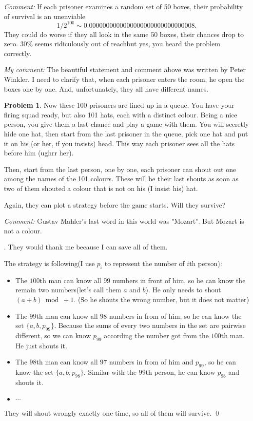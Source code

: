 \documentclass[12pt]{article}
\theoremstyle{definition}
\newtheorem{hw}{Problem}
\newenvironment{sol}
  {\par\vspace{3mm}\noindent{\it Solution}.}
  {\qed}
\begin{document}
{\em Comment:} If each prisoner examines a random set of 50 boxes, their probability of survival
is an unenviable 
\[1/2^{100} \sim 0.0000000000000000000000000000008.\] They could do worse if they all
look in the same 50 boxes, their chances drop to zero. 30\% seems ridiculously out of reachbut
yes, you heard the problem correctly.

{\em My comment:} The beautiful statement and comment above was written by Peter Winkler. I need
to clarify that, when each prisoner enters the room, he open
the boxes one by one. And, unfortunately, they all have different names.

\begin{hw}
Now these 100 prisoners are lined up in a queue. You have your firing squad ready, but also 101 hats, each with a distinct colour. 
Being a nice person, you give them a last chance and play a game with them. You will secretly hide one hat, then start from the last prisoner in the queue, pick one hat and put it on his (or her, if you insists) head. This way each prisoner sees all the hats before him
(ughrr her).

Then, start from the last person, one by one, each prisoner can shout out one among the names of the 101 colours. These will be their last shouts as soon as two of them shouted a colour that is not on his (I insist his) hat.

Again, they can plot a strategy before the game starts. Will they survive?
\end{hw}

{\em Comment:} Gustav Mahler's last word in this world was "Mozart". But Mozart is not a colour.

\begin{sol}
	They would thank me because I can save all of them.
	
	The strategy is following(I use $p_i$ to represent the number of $i$th person):
	\begin{itemize}
		\item The $100$th man can know all $99$ numbers in front of him, so he can know the remain two numbers(let's call them $a$ and $b$). He only needs to shout $(a+b) \bmod + 1$. (So he shouts the wrong number, but it does not matter)
		\item The $99$th man can know all $98$ numbers in from of him, so he can know the set $\{a, b, p_{99}\}$. Because the sums of every two numbers in the set are pairwise different, so we can know $p_{99}$ according the number got from the $100$th man. He just shouts it.
		\item The $98$th man can know all $97$ numbers in from of him and $p_{99}$, so he can know the set $\{a, b, p_{98}\}$. Similar with the $99$th person, he can know $p_{98}$ and shouts it.
		\item $\cdots$
	\end{itemize}
	They will shout wrongly exactly one time, so all of them will survive.
\end{sol}
\end{document}
